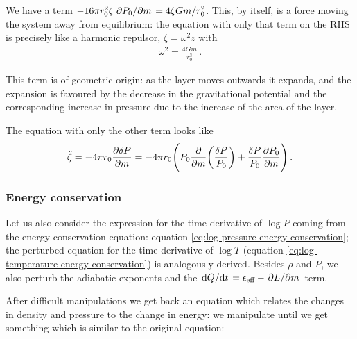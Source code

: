 \documentclass[main.tex]{subfiles}
\begin{document}
We have a term \(-16 \pi r_0^2 \zeta \pdv*{P_0}{m} = 4 \zeta Gm /r_0^2\).
This, by itself, is a force moving the system away from equilibrium: the equation with only that term on the RHS is precisely like a harmonic repulsor, \(\ddot{\zeta} = \omega^2 z\) with 
%
\begin{align}
\omega^2 = \frac{4Gm}{r_0^3}
\,.
\end{align}

This term is of geometric origin: as the layer moves outwards it expands, and the expansion is favoured by the decrease in the gravitational potential and the corresponding increase in pressure due to the increase of the area of the layer. 

The equation with only the other term looks like 
%
\begin{align}
\ddot{\zeta} = - 4 \pi r_0 \pdv{ \delta P }{m}
= - 4 \pi r_0  \qty( P_0 \pdv{}{m} \qty(\frac{ \delta P }{P_0 }) + \frac{ \delta P}{P_0 } \pdv{P_0 }{m})
\,.
\end{align}


\subsubsection{Energy conservation}

Let us also consider the expression for the time derivative of \(\log P\) coming from the energy conservation equation: equation \eqref{eq:log-pressure-energy-conservation}; the perturbed equation for the time derivative of \(\log T\) (equation \eqref{eq:log-temperature-energy-conservation}) is analogously derived.  
Besides \(\rho \) and \(P\), we also perturb the adiabatic exponents and the \(\dv*{Q}{t} = \epsilon_{\text{eff}} - \pdv*{L}{m}\) term.

After difficult manipulations we get back an equation which relates the changes in density and pressure to the change in energy: we manipulate until we get something which is similar to the original equation: 
%
\end{document}
